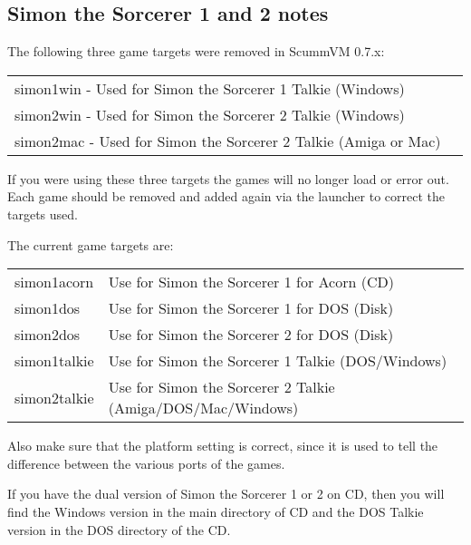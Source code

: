 \subsection{Simon the Sorcerer 1 and 2 notes}
The following three game targets were removed in ScummVM 0.7.x:

\begin{tabular}{ll}
 simon1win    - Used for Simon the Sorcerer 1 Talkie (Windows)\\
 simon2win    - Used for Simon the Sorcerer 2 Talkie (Windows)\\
 simon2mac    - Used for Simon the Sorcerer 2 Talkie (Amiga or Mac)\\
\end{tabular}

If you were using these three targets the games will no longer load or
error out. Each game should be removed and added again via the launcher
to correct the targets used.

The current game targets are:

\begin{tabular}{ll}
 simon1acorn  & Use for Simon the Sorcerer 1 for Acorn (CD)\\
 simon1dos    & Use for Simon the Sorcerer 1 for DOS (Disk)\\
 simon2dos    & Use for Simon the Sorcerer 2 for DOS (Disk)\\
 simon1talkie & Use for Simon the Sorcerer 1 Talkie (DOS/Windows)\\
 simon2talkie & Use for Simon the Sorcerer 2 Talkie (Amiga/DOS/Mac/Windows)\\
\end{tabular}

Also make sure that the platform setting is correct, since it is used
to tell the difference between the various ports of the games.

If you have the dual version of Simon the Sorcerer 1 or 2 on CD,
then you will find the Windows version in the main directory of CD
and the DOS Talkie version in the DOS directory of the CD.
